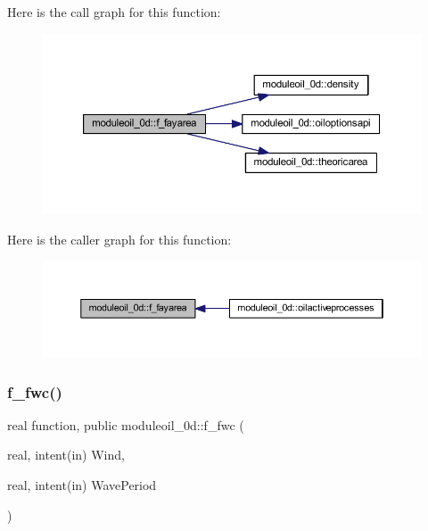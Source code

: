 Here is the call graph for this function\+:\nopagebreak
\begin{figure}[H]
\begin{center}
\leavevmode
\includegraphics[width=350pt]{namespacemoduleoil__0d_a4e51cfec6aa7ab1925d6fe26889918be_cgraph}
\end{center}
\end{figure}
Here is the caller graph for this function\+:\nopagebreak
\begin{figure}[H]
\begin{center}
\leavevmode
\includegraphics[width=350pt]{namespacemoduleoil__0d_a4e51cfec6aa7ab1925d6fe26889918be_icgraph}
\end{center}
\end{figure}
\mbox{\label{namespacemoduleoil__0d_a61a73c3b473d2b0773d7812c5c93cea0}} 
\subsubsection{\texorpdfstring{f\+\_\+fwc()}{f\_fwc()}}
{\footnotesize\ttfamily real function, public moduleoil\+\_\+0d\+::f\+\_\+fwc (\begin{DoxyParamCaption}\item[{real, intent(in)}]{Wind,  }\item[{real, intent(in)}]{Wave\+Period }\end{DoxyParamCaption})}


